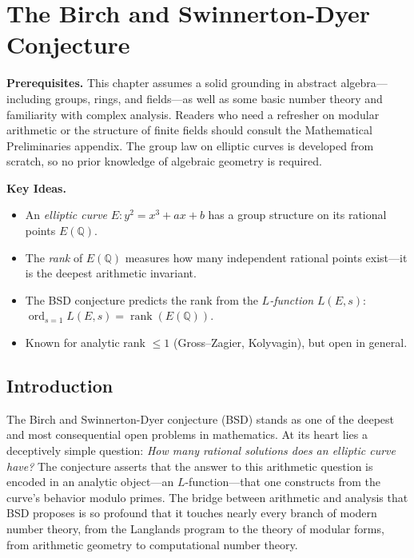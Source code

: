 \chapter{The Birch and Swinnerton-Dyer Conjecture}
\label{ch:birch}

\medskip\noindent\textbf{Prerequisites.} This chapter assumes a solid grounding in abstract algebra---including groups, rings, and fields---as well as some basic number theory and familiarity with complex analysis. Readers who need a refresher on modular arithmetic or the structure of finite fields should consult the Mathematical Preliminaries appendix. The group law on elliptic curves is developed from scratch, so no prior knowledge of algebraic geometry is required.

\noindent\textbf{Key Ideas.}
\begin{itemize}
  \item An \emph{elliptic curve} $E: y^2 = x^3 + ax + b$ has a group structure on its rational points $E(\mathbb{Q})$.
  \item The \emph{rank} of $E(\mathbb{Q})$ measures how many independent rational points exist---it is the deepest arithmetic invariant.
  \item The BSD conjecture predicts the rank from the \emph{$L$-function} $L(E,s)$: $\operatorname{ord}_{s=1} L(E,s) = \operatorname{rank}(E(\mathbb{Q}))$.
  \item Known for analytic rank $\le 1$ (Gross--Zagier, Kolyvagin), but open in general.
\end{itemize}

\bigskip

\section{Introduction}
\label{sec:bsd-intro}

The Birch and Swinnerton-Dyer conjecture (BSD) stands as one of the deepest and most consequential open problems in mathematics. At its heart lies a deceptively simple question: \emph{How many rational solutions does an elliptic curve have?} The conjecture asserts that the answer to this arithmetic question is encoded in an analytic object---an $L$-function---that one constructs from the curve's behavior modulo primes. The bridge between arithmetic and analysis that BSD proposes is so profound that it touches nearly every branch of modern number theory, from the Langlands program to the theory of modular forms, from arithmetic geometry to computational number theory.

